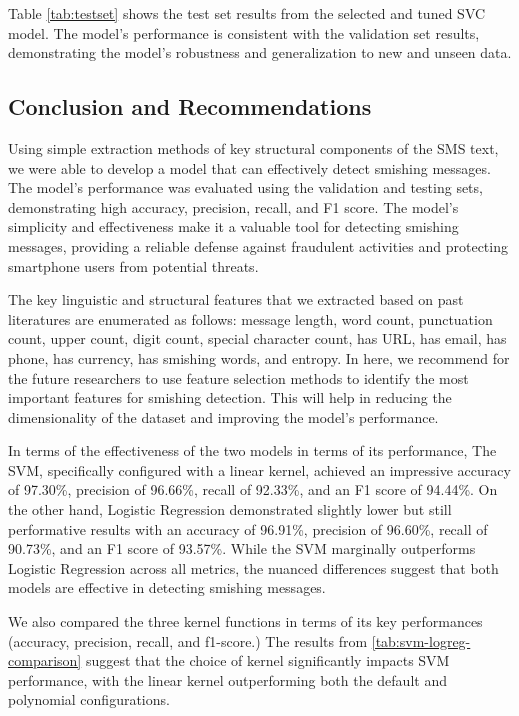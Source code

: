 \documentclass[conference]{IEEEtran}
\begin{document}
Table \ref{tab:testset} shows the test set results from the selected and tuned SVC model. The model's performance is consistent with the validation set results, demonstrating the model's robustness and generalization to new and unseen data.

\subsection*{Conclusion and Recommendations}

Using simple extraction methods of key structural components of the SMS text, we were able to develop a model that can effectively detect smishing messages. The model's performance was evaluated using the validation and testing sets, demonstrating high accuracy, precision, recall, and F1 score. The model's simplicity and effectiveness make it a valuable tool for detecting smishing messages, providing a reliable defense against fraudulent activities and protecting smartphone users from potential threats.

The key linguistic and structural features that we extracted based on past literatures are enumerated as follows: message length, word count, punctuation count, upper count, digit count, special character count, has URL, has email, has phone, has currency, has smishing words, and entropy. In here, we recommend for the future researchers to use feature selection methods to identify the most important features for smishing detection. This will help in reducing the dimensionality of the dataset and improving the model's performance.

In terms of the effectiveness of the two models in terms of its performance, The SVM, specifically configured with a linear kernel, achieved an impressive accuracy of 97.30\%, precision of 96.66\%, recall of 92.33\%, and an F1 score of 94.44\%. On the other hand, Logistic Regression demonstrated slightly lower but still performative results with an accuracy of 96.91\%, precision of 96.60\%, recall of 90.73\%, and an F1 score of 93.57\%. While the SVM marginally outperforms Logistic Regression across all metrics, the nuanced differences suggest that both models are effective in detecting smishing messages.

We also compared the three kernel functions in terms of its key performances (accuracy, precision, recall, and f1-score.) The results from \ref{tab:svm-logreg-comparison} suggest that the choice of kernel significantly impacts SVM performance, with the linear kernel outperforming both the default and polynomial configurations.
\end{document}

